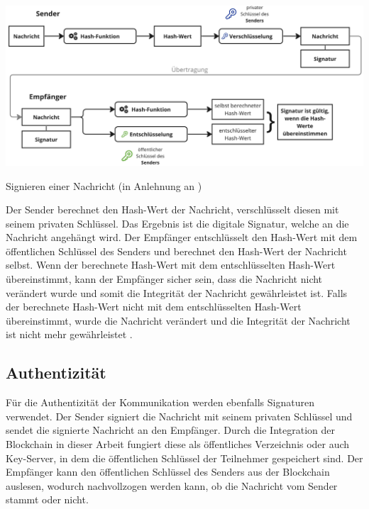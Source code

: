 \begin{center}
    \captionsetup{type=figure}
    \includegraphics[width=1\linewidth]{images/signatur_2.jpg}
    \caption{Signieren einer Nachricht (in Anlehnung an \cite{DocuSign_digitaleSignaturen})}
    \label{fig:signatur}
\end{center}

\noindent Der Sender berechnet den Hash-Wert der Nachricht, verschlüsselt diesen mit seinem privaten Schlüssel. Das Ergebnis ist die digitale Signatur, welche an die Nachricht angehängt wird. Der Empfänger entschlüsselt den Hash-Wert mit dem öffentlichen Schlüssel des Senders und berechnet den Hash-Wert der Nachricht selbst. Wenn der berechnete Hash-Wert mit dem entschlüsselten Hash-Wert übereinstimmt, kann der Empfänger sicher sein, dass die Nachricht nicht verändert wurde und somit die Integrität der Nachricht gewährleistet ist. Falls der berechnete Hash-Wert nicht mit dem entschlüsselten Hash-Wert übereinstimmt, wurde die Nachricht verändert und die Integrität der Nachricht ist nicht mehr gewährleistet \Parencite[S. 73-78]{Hellmann_IT-Sicherheit}.


\subsection{Authentizität}

Für die Authentizität der Kommunikation werden ebenfalls Signaturen verwendet. Der Sender signiert die Nachricht mit seinem privaten Schlüssel und sendet die signierte Nachricht an den Empfänger. Durch die Integration der Blockchain in dieser Arbeit fungiert diese als öffentliches Verzeichnis oder auch Key-Server, in dem die öffentlichen Schlüssel der Teilnehmer gespeichert sind. Der Empfänger kann den öffentlichen Schlüssel des Senders aus der Blockchain auslesen, wodurch nachvollzogen werden kann, ob die Nachricht vom Sender stammt oder nicht.


